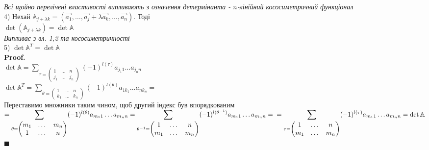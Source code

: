 \documentclass[a4paper, 14pt]{extarticle}
\def\huge{\displaystyle}
\def\proof{\textbf{Proof.}\\}
\def\bigline{\vspace{5mm}\\}
\def\qed{$\blacksquare$}
\begin{document}
\textit{Всі щойно перелічені властивості випливають з означення детермінанта - $n$-лінійний кососиметричний функціонал}
\bigline
4) Нехай $\mathbb{A}_{j + \lambda k} = (\vec{a_1},\dots, \vec{a_j} + \lambda \vec{a_k}, \dots, \vec{a_n})$. Тоді\\
$\det (\mathbb{A}_{j + \lambda k}) = \det \mathbb{A}$\\
\textit{Випливає з вл. 1,2 та кососиметричності}
\bigline
5) $\det \mathbb{A}^T = \det \mathbb{A}$\\
\proof
$\det \mathbb{A} = \huge \sum_{\tau = \begin{pmatrix} 1 & \dots & n \\ j_1 & \dots & j_n \end{pmatrix}} (-1)^{l(\tau)}a_{j_1 1}\dots a_{j_n n}$\\
$\det \mathbb{A}^T = \huge \sum_{\theta = \begin{pmatrix} 1 & \dots & n \\ k_1 & \dots & k_n \end{pmatrix}} (-1)^{l(\theta)}a_{1 k_1 }\dots a_{n k_n} =$\\
Переставимо множники таким чином, щоб другий індекс був впорядкованим\\
$= \huge \sum_{\theta = \begin{pmatrix} m_1 & \dots & m_n \\ 1 & \dots & n \end{pmatrix}} (-1)^{l(\theta)}a_{m_1 1}\dots a_{m_n n} = \sum_{\theta^{-1} = \begin{pmatrix} 1 & \dots & n\\ m_1 & \dots & m_n \end{pmatrix}} (-1)^{l(\theta^{-1})}a_{m_1 1}\dots a_{m_n n} = \\
= \sum_{\tau = \begin{pmatrix} 1 & \dots & n \\ m_1 & \dots & m_n \end{pmatrix}} (-1)^{l(\tau)}a_{m_1 1}\dots a_{m_n n} = \det \mathbb{A}$ \qed
\end{document}
